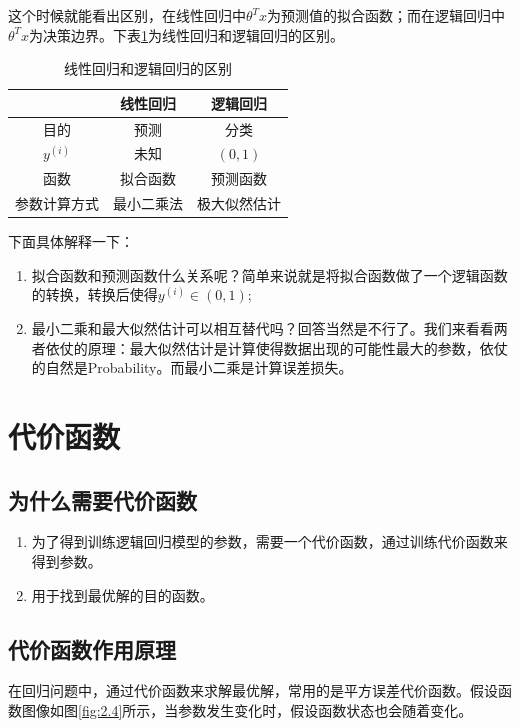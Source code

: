 这个时候就能看出区别，在线性回归中$\theta ^{T}x$为预测值的拟合函数；而在逻辑回归中$\theta ^{T}x$为决策边界。下表\ref{tab:2.3}为线性回归和逻辑回归的区别。

\begin{table}[h]
	\centering
	\begin{tabular}{|c|c|c|}\hline
		& 线性回归 & 逻辑回归 \\\hline
		目的 & 预测 & 分类 \\\hline
		$y^{(i)}$  & 未知 & $(0,1)$ \\\hline
		函数 & 拟合函数 & 预测函数 \\\hline
		参数计算方式 & 最小二乘法 & 极大似然估计 \\\hline
	\end{tabular}
	\caption{线性回归和逻辑回归的区别}
	\label{tab:2.3}
\end{table}


下面具体解释一下： 
\begin{enumerate}
			\itemsep0em 
\item 拟合函数和预测函数什么关系呢？简单来说就是将拟合函数做了一个逻辑函数的转换，转换后使得$y^{(i)} \in (0,1)$;
\item 最小二乘和最大似然估计可以相互替代吗？回答当然是不行了。我们来看看两者依仗的原理：最大似然估计是计算使得数据出现的可能性最大的参数，依仗的自然是Probability。而最小二乘是计算误差损失。
\end{enumerate}

\section{代价函数}

\subsection{为什么需要代价函数}

\begin{enumerate}
			\itemsep0em 
\item 为了得到训练逻辑回归模型的参数，需要一个代价函数，通过训练代价函数来得到参数。
\item 用于找到最优解的目的函数。
\end{enumerate}

\subsection{代价函数作用原理}
在回归问题中，通过代价函数来求解最优解，常用的是平方误差代价函数。假设函数图像如图\ref{fig:2.4}所示，当参数发生变化时，假设函数状态也会随着变化。

